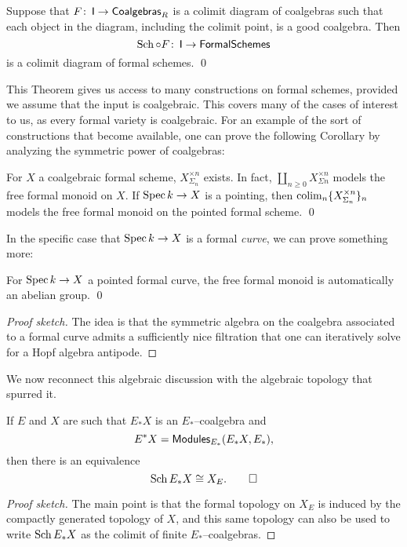 \begin{theorem}\label{CoalgebraicColimitsExist}
Suppose that $F\colon\thinspace \mathsf{I} \to \mathsf{Coalgebras}_R$ is a colimit diagram of coalgebras such that each object in the diagram, including the colimit point, is a good coalgebra.  Then \[\operatorname{Sch} \circ F\colon\thinspace \mathsf{I} \to \mathsf{FormalSchemes}\] is a colimit diagram of formal schemes. \qed
\end{theorem}

This Theorem gives us access to many constructions on formal schemes, provided we assume that the input is coalgebraic.  This covers many of the cases of interest to us, as every formal variety is coalgebraic.  For an example of the sort of constructions that become available, one can prove the following Corollary by analyzing the symmetric power of coalgebras:

\begin{corollary}
For $X$ a coalgebraic formal scheme, $X^{\times n}_{\Sigma_n}$ exists.  In fact, $\coprod_{n \ge 0} X^{\times n}_{\Sigma n}$ models the free formal monoid on $X$.  If $\operatorname{Spec} k \to X$ is a pointing, then $\operatorname*{colim}_n \{X^{\times n}_{\Sigma_n}\}_n$ models the free formal monoid on the pointed formal scheme. \qed
\end{corollary}

In the specific case that $\operatorname{Spec} k \to X$ is a formal \emph{curve}, we can prove something more:
\begin{corollary}\label{FreeFormalGroupOnACurve}
For $\operatorname{Spec} k \to X$ a pointed formal curve, the free formal monoid is automatically an abelian group. \qed
\end{corollary}
\begin{proof}[Proof sketch]
The idea is that the symmetric algebra on the coalgebra associated to a formal curve admits a sufficiently nice filtration that one can iteratively solve for a Hopf algebra antipode.
\end{proof}

We now reconnect this algebraic discussion with the algebraic topology that spurred it.

\begin{lemma}
If $E$ and $X$ are such that $E_* X$ is an $E_*$--coalgebra and \[E^* X = \mathsf{Modules}_{E_*}(E_* X, E_*),\] then there is an equivalence \[\operatorname{Sch} E_* X \cong X_E. \qed\]
\end{lemma}
\begin{proof}[Proof sketch]
The main point is that the formal topology on $X_E$ is induced by the compactly generated topology of $X$, and this same topology can also be used to write $\operatorname{Sch} E_* X$ as the colimit of finite $E_*$--coalgebras.
\end{proof}

